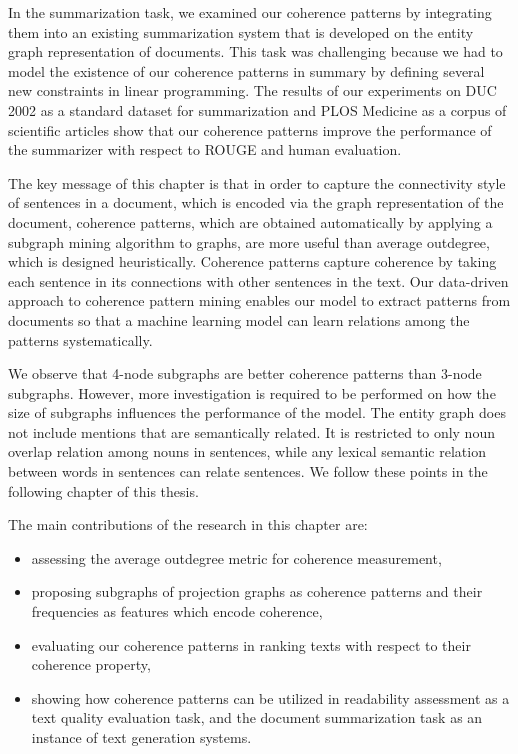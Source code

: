 In the summarization task, we examined our coherence patterns by integrating them into an existing summarization system that is developed on the entity graph representation of documents. 
This task was challenging because we had to model the existence of our coherence patterns in summary by defining several new constraints in linear programming.  
The results of our experiments on DUC 2002 as a standard dataset for summarization and PLOS Medicine as a corpus of scientific articles show that our coherence patterns improve the performance of the summarizer with respect to ROUGE and human evaluation. 


The key message of this chapter is that in order to capture the connectivity style of sentences in a document, which is encoded via the graph representation of the document, coherence patterns, which are obtained automatically by applying a subgraph mining algorithm to graphs, are more useful than average outdegree, which is designed heuristically. 
Coherence patterns capture coherence by taking each sentence in its connections with other sentences in the text. 
Our \mbox{data-driven} approach to coherence pattern mining enables our model to extract patterns from documents so that a machine learning model can learn relations among the patterns systematically. 

We observe that 4-node subgraphs are better coherence patterns than 3-node subgraphs. 
However, more investigation is required to be performed on how the size of subgraphs influences the performance of the model. 
The entity graph does not include mentions that are semantically related.  
It is restricted to only noun overlap relation among nouns in sentences, while any lexical semantic relation between words in sentences can relate sentences. 
We follow these points in the following chapter of this thesis. 

The main contributions of the research in this chapter are:

\begin{itemize}
\item assessing the average outdegree metric for coherence measurement,
\item proposing subgraphs of projection graphs as coherence patterns and their frequencies as features which encode coherence, 
\item evaluating our coherence patterns in ranking texts with respect to their coherence property,
\item showing how coherence patterns can be utilized in readability assessment as a text quality evaluation task, and the document summarization task as an instance of text generation systems.   
\end{itemize}


